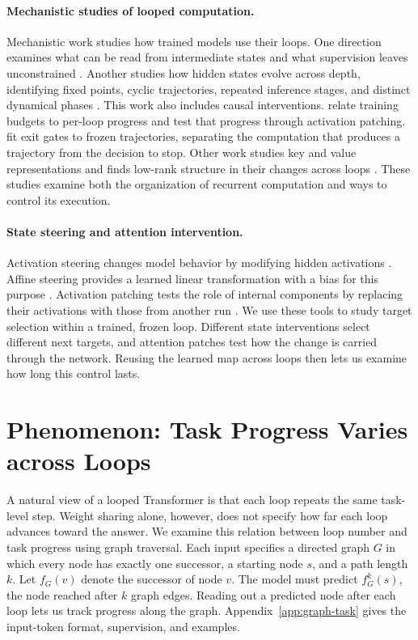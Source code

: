 \documentclass{article}
\begin{document}
\paragraph{Mechanistic studies of looped computation.}
Mechanistic work studies how trained models use their loops. One direction examines what can be read from intermediate states and what supervision leaves unconstrained \citep{lu2025probing,fan2026lotus,sharma2026readout}. Another studies how hidden states evolve across depth, identifying fixed points, cyclic trajectories, repeated inference stages, and distinct dynamical phases \citep{blayney2026mechanistic,kapl2026growing,kim2026phase}. This work also includes causal interventions. \citet{zhang2026recurrence} relate training budgets to per-loop progress and test that progress through activation patching. \citet{popescu2026adaptive} fit exit gates to frozen trajectories, separating the computation that produces a trajectory from the decision to stop. Other work studies key and value representations and finds low-rank structure in their changes across loops \citep{oneill2026looped}. These studies examine both the organization of recurrent computation and ways to control its execution.

\paragraph{State steering and attention intervention.}
Activation steering changes model behavior by modifying hidden activations \citep{turner2023activation}. Affine steering provides a learned linear transformation with a bias for this purpose \citep{singh2024surgery}. Activation patching tests the role of internal components by replacing their activations with those from another run \citep{wang2023ioi}. We use these tools to study target selection within a trained, frozen loop. Different state interventions select different next targets, and attention patches test how the change is carried through the network. Reusing the learned map across loops then lets us examine how long this control lasts.

\section{Phenomenon: Task Progress Varies across Loops}
\label{sec:underdetermined}
A natural view of a looped Transformer is that each loop repeats the same task-level step. Weight sharing alone, however, does not specify how far each loop advances toward the answer. We examine this relation between loop number and task progress using graph traversal. Each input specifies a directed graph $G$ in which every node has exactly one successor, a starting node $s$, and a path length $k$. Let $f_G(v)$ denote the successor of node $v$. The model must predict $f_G^k(s)$, the node reached after $k$ graph edges. Reading out a predicted node after each loop lets us track progress along the graph. Appendix~\ref{app:graph-task} gives the input-token format, supervision, and examples.
\end{document}
